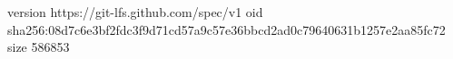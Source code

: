 version https://git-lfs.github.com/spec/v1
oid sha256:08d7c6e3bf2fdc3f9d71cd57a9c57e36bbcd2ad0c79640631b1257e2aa85fc72
size 586853
